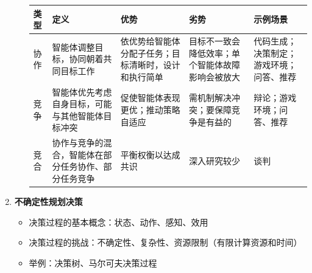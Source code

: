 \documentclass[../main.tex]{subfiles}
\begin{document}
\begin{enumerate}
\begin{itemize}
\begin{table}[H]
{\begin{tabular}{p{1.8cm}p{4.0cm}p{3.8cm}p{3.8cm}p{2.8cm}}
            \toprule
            类型 & 定义 & 优势 & 劣势 & 示例场景 \\
            \midrule
            协作 & 智能体调整目标，协同朝着共同目标工作 & 依优势给智能体分配子任务；目标清晰时，设计和执行简单 & 目标不一致会降低效率；单个智能体故障影响会被放大 & 代码生成；决策制定；游戏环境；问答、推荐 \\
            竞争 & 智能体优先考虑自身目标，可能与其他智能体目标冲突 & 促使智能体表现更优；推动策略自适应 & 需机制解决冲突；要保障竞争是有益的 & 辩论；游戏环境；问答、推荐 \\
            竞合 & 协作与竞争的混合，智能体在部分任务协作、部分任务竞争 & 平衡权衡以达成共识 & 深入研究较少 & 谈判 \\
            \bottomrule
        \end{tabular}
        }
    \end{table}
    \begin{table}[H]
    \centering
    \caption{多智能体的协作策略}
\end{table}
    \end{itemize}
    \item \textbf{不确定性规划决策}
    \begin{itemize}
        \item 决策过程的基本概念：状态、动作、感知、效用
        \item 决策过程的挑战：不确定性、复杂性、资源限制（有限计算资源和时间）
        \item 举例：决策树、马尔可夫决策过程
    \end{itemize}
\end{enumerate}
\end{document}
